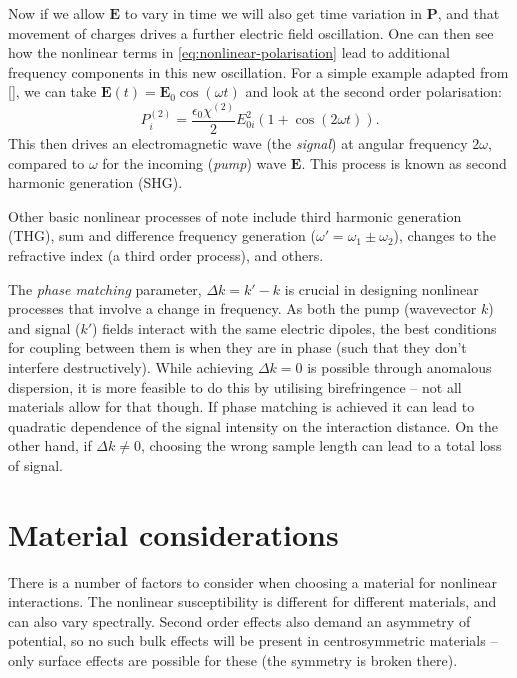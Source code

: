 \documentclass[12pt,a4paper]{article}
\newcommand{\citein}[1]{[\citen{#1}]}
\begin{document}
Now if we allow $\bm{E}$ to vary in time we will also get time variation in $\bm{P}$, and that movement of charges drives a further electric field oscillation. One can then see how the nonlinear terms in \eqref{eq:nonlinear-polarisation} lead to additional frequency components in this new oscillation. For a simple example adapted from \citein{boydNonlinearOptics2008}, we can take $\bm{E}(t)=\bm{E}_0\cos(\omega t)$ and look at the second order polarisation:
\begin{equation}
	\label{eq:example-polarisation}
	P_i^{(2)}=\frac{\epsilon_0\chi^{(2)}}{2}E_{0i}^2\left(1+\cos(2\omega t)\right).
\end{equation}
This then drives an electromagnetic wave (the \emph{signal}) at angular frequency $2\omega$, compared to $\omega$ for the incoming (\emph{pump}) wave $\bm{E}$. This process is known as second harmonic generation (SHG).

Other basic nonlinear processes of note include third harmonic generation (THG), sum and difference frequency generation ($\omega'=\omega_1\pm\omega_2$), changes to the refractive index (a third order process), and others\cite{boydNonlinearOptics2008}.

The \emph{phase matching} parameter, $\Delta k = k'-k$ is crucial in designing nonlinear processes that involve a change in frequency\cite{boydNonlinearOptics2008}. As both the pump (wavevector $k$) and signal ($k'$) fields interact with the same electric dipoles, the best conditions for coupling between them is when they are in phase (such that they don't interfere destructively). While achieving $\Delta k=0$ is possible through anomalous dispersion, it is more feasible to do this by utilising birefringence\cite{raoNonlinearFrequencyConversion2004} -- not all materials allow for that though. If phase matching is achieved it can lead to quadratic dependence of the signal intensity on the interaction distance. On the other hand, if $\Delta k\neq 0$, choosing the wrong sample length can lead to a total loss of signal\cite{boydNonlinearOptics2008}.

\section{Material considerations}
There is a number of factors to consider when choosing a material for nonlinear interactions. The nonlinear susceptibility is different for different materials\cite{burnsThirdHarmonicGenerationAbsorbing1971}, and can also vary spectrally\cite{carnemollaDegenerateOpticalNonlinear2018a}. Second order effects also demand an asymmetry of potential, so no such bulk effects will be present in centrosymmetric materials -- only surface effects are possible for these (the symmetry is broken there)\cite{boydNonlinearOptics2008}.
\end{document}
